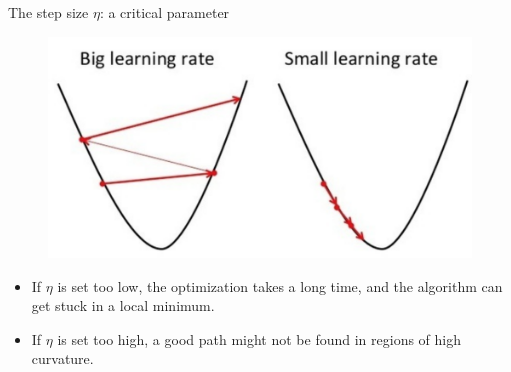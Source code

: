 \documentclass[handout,xcolor=pdftex,dvipsnames,table,mathserif]{beamer}
\begin{document}
\begin{frame}{The step size $\eta$: a critical parameter}
\begin{figure}[htb]
	\centering
	\includegraphics[width=.75\columnwidth]{../graphics/BigLearningRate}
\end{figure}
\begin{itemize}
\item If $\eta$ is set too low, the optimization takes a long time, and the algorithm can get stuck in a local minimum. 
\item If $\eta$ is set too high, a good path might not be found in regions of high curvature. 
\end{itemize}
\end{frame}
\end{document}
